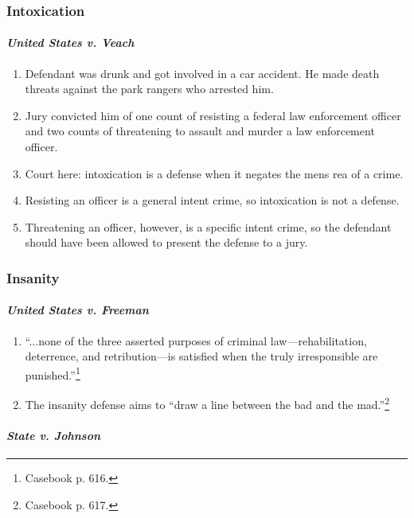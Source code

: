 \subsubsection{Intoxication}

\paragraph{\emph{United States v. Veach}}

\begin{enumerate}
    \item Defendant was drunk and got involved in a car accident. He made death threats against the park rangers who arrested him.
    \item Jury convicted him of one count of resisting a federal law enforcement officer and two counts of threatening to assault and murder a law enforcement officer.
    \item Court here: intoxication is a defense when it negates the mens rea of a crime.
    \item Resisting an officer is a general intent crime, so intoxication is not a defense.
    \item Threatening an officer, however, is a specific intent crime, so the defendant should have been allowed to present the defense to a jury.
\end{enumerate}

\subsubsection{Insanity}

\paragraph{\emph{United States v. Freeman}}

\begin{enumerate}
    \item ``...none of the three asserted purposes of criminal law---rehabilitation, deterrence, and retribution---is satisfied when the truly irresponsible are punished.''\footnote{Casebook p. 616.}
    \item The insanity defense aims to ``draw a line between the bad and the mad.''\footnote{Casebook p. 617.}
\end{enumerate}

\paragraph{\emph{State v. Johnson}}

